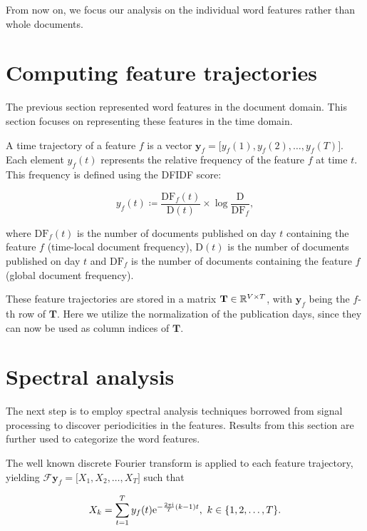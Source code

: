 From now on, we focus our analysis on the individual word features rather than whole documents.

\section{Computing feature trajectories}
The previous section represented word features in the document domain. This section focuses on representing these features in the time domain.

A time trajectory of a feature $f$ is a vector $\mathbf{y}_f = \big[y_{f}(1), y_{f}(2), \dots, y_{f}(T)\big]$. Each element $y_{f}(t)$ represents the relative frequency of the feature $f$ at time $t$. This frequency is defined using the DFIDF score:

\begin{equation}
	y_{f}(t) \coloneqq \frac{\text{DF}_{f}(t)}{\text{D}(t)} \times \log{\frac{\text{D}}{\text{DF}_{f}}},
\end{equation}

where $\text{DF}_{f}(t)$ is the number of documents published on day $t$ containing the feature $f$ (time-local document frequency), $\text{D}(t)$ is the number of documents published on day $t$ and $\text{DF}_{f}$ is the number of documents containing the feature $f$ (global document frequency).

These feature trajectories are stored in a matrix $\mathbf{T} \in \mathbb{R}^{V \times T}$, with $\mathbf{y}_f$ being the $f$-th row of $\mathbf{T}$. Here we utilize the normalization of the publication days, since they can now be used as column indices of $\mathbf{T}$.


\section{Spectral analysis}
The next step is to employ spectral analysis techniques borrowed from signal processing to discover periodicities in the features. Results from this section are further used to categorize the word features.

The well known discrete Fourier transform is applied to each feature trajectory, yielding $\mathcal{F} \mathbf{y}_{f} = \big[X_{1}, X_{2}, \dots, X_{T}\big]$ such that

\begin{equation}
	X_{k} = \sum_{t = 1}^{T}{y_{f}(t) \mathrm{e}^{- \frac{2 \pi \mathrm{i}}{T} (k - 1) t}}, ~ k \in \{1, 2, \dots, T\}.
\end{equation}

